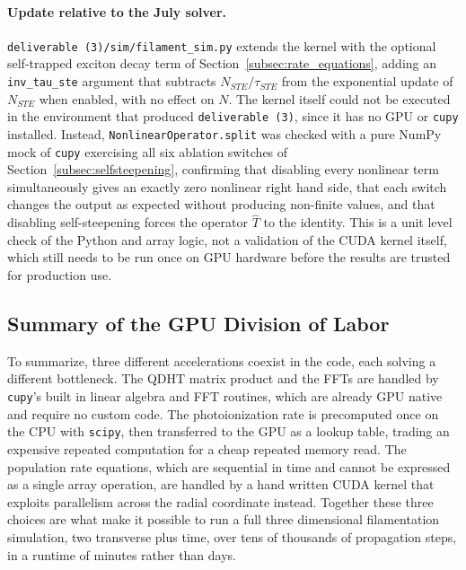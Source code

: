 \paragraph{Update relative to the July solver.} \texttt{deliverable~(3)/sim/filament\_sim.py} extends the kernel with the optional self-trapped exciton decay term of Section~\ref{subsec:rate_equations}, adding an \texttt{inv\_tau\_ste} argument that subtracts $N_{STE}/\tau_{STE}$ from the exponential update of $N_{STE}$ when enabled, with no effect on $N$. The kernel itself could not be executed in the environment that produced \texttt{deliverable~(3)}, since it has no GPU or \texttt{cupy} installed. Instead, \texttt{NonlinearOperator.split} was checked with a pure NumPy mock of \texttt{cupy} exercising all six ablation switches of Section~\ref{subsec:selfsteepening}, confirming that disabling every nonlinear term simultaneously gives an exactly zero nonlinear right hand side, that each switch changes the output as expected without producing non-finite values, and that disabling self-steepening forces the operator $\hat{T}$ to the identity. This is a unit level check of the Python and array logic, not a validation of the CUDA kernel itself, which still needs to be run once on GPU hardware before the results are trusted for production use.

\subsection{Summary of the GPU Division of Labor}

To summarize, three different accelerations coexist in the code, each solving a different bottleneck. The QDHT matrix product and the FFTs are handled by \texttt{cupy}'s built in linear algebra and FFT routines, which are already GPU native and require no custom code. The photoionization rate is precomputed once on the CPU with \texttt{scipy}, then transferred to the GPU as a lookup table, trading an expensive repeated computation for a cheap repeated memory read. The population rate equations, which are sequential in time and cannot be expressed as a single array operation, are handled by a hand written CUDA kernel that exploits parallelism across the radial coordinate instead. Together these three choices are what make it possible to run a full three dimensional filamentation simulation, two transverse plus time, over tens of thousands of propagation steps, in a runtime of minutes rather than days.
